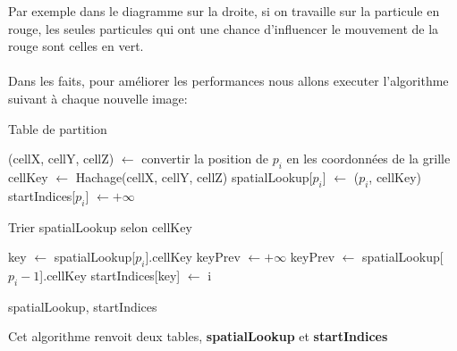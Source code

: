 \documentclass[a4paper,10pt]{report}
\begin{document}
Par exemple dans le diagramme sur la droite, si on travaille sur la particule en rouge, les seules particules qui ont une chance d'influencer le mouvement de la rouge sont celles en vert.
\\
\\
Dans les faits, pour améliorer les performances nous allons executer l'algorithme suivant à chaque nouvelle image:
\begin{algorithm}
\caption{Table de partition}
\label{CHalgorithm}
\begin{algorithmic}[1]
\State (cellX, cellY, cellZ) $\leftarrow$ convertir la position de $p_i$ en les coordonnées de la grille
\State cellKey $\leftarrow$ Hachage(cellX, cellY, cellZ)
\State spatialLookup[$p_i$] $\leftarrow$ ($p_i$, cellKey)
\State startIndices[$p_i$] $\leftarrow +\infty$
\EndFor

\State Trier spatialLookup selon cellKey

\State key $\leftarrow$ spatialLookup[$p_i$].cellKey
\State keyPrev $\leftarrow +\infty$
\Else
\State keyPrev $\leftarrow$ spatialLookup[$p_i - 1$].cellKey
\EndIf
{}
\State startIndices[key] $\leftarrow$ i
\EndIf
\EndFor

\Return spatialLookup, startIndices
\EndProcedure
\end{algorithmic}
\end{algorithm}

Cet algorithme renvoit deux tables, \textbf{spatialLookup} et \textbf{startIndices}
\end{document}
